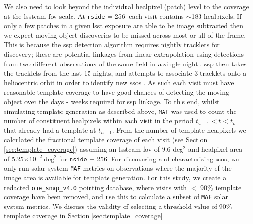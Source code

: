 \documentclass[preprintm,linenumbers]{aastex631}
\newcommand{\baseline}{\texttt{one\_snap\_v4.0}\xspace}
\newcommand{\maf}{\texttt{MAF}\xspace}
\providecommand{\e}[1]{\ensuremath{\times 10^{#1}}}
\begin{document}
		
		We also need to look beyond the individual healpixel (patch) level to the coverage at the \gls*{lsstcam} \gls*{fov} scale. 
  At \texttt{nside} = 256, each visit contains $\sim$183 healpixels.
  If only a few patches in a given \gls*{lsst} exposure are able to be image subtracted then we expect moving object discoveries to be missed across most or all of the frame. 
  This is because the \gls*{ssp} detection algorithm requires nightly tracklets for  discovery; these are potential linkages from linear extrapolation using detections from two different observations of the same field in a single night \citep{lsstMOPS,lsstSSP}.  
  \gls*{ssp} then takes the tracklets from the last 15 nights, and attempts to associate 3 tracklets onto a heliocentric orbit in order to identify new \glspl*{sso} \citep{kubica2007,lsstMOPS,lsstSSP}. 
  As such each visit must have reasonable template coverage to have good chances of detecting the moving object over the days - weeks required for \gls*{ssp} linkage.
  To this end, whilst simulating template generation as described above, \maf was used to count the number of constituent healpixels within each visit in the period $t_{n-1} < t < t_n$ that already had a template at $t_{n-1}$.
  From the number of template healpixels we calculated the fractional template coverage of each visit (see Section \ref{sec:template_coverage}) assuming an \gls*{lsstcam} \gls*{fov} of 9.6 deg$^2$ and healpixel area of $5.25\e{-2}\ \mathrm{deg}^2$ for \texttt{nside} = 256.
  For discovering and characterizing \glspl*{sso}, we only run solar system \maf metrics on observations where the majority of the image area is available for template generation. For this study, we create a redacted  \baseline pointing database, where visits with $<$ 90$\%$ template coverage have been removed, and use this to calculate a subset of \maf solar system metrics.  We discuss the validity of selecting a threshold value of 90$\%$  template coverage in Section \ref{sec:template_coverage}.
  
\end{document}
